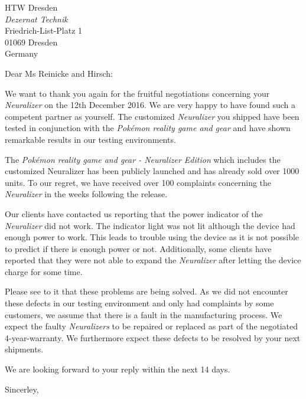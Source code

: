 \begin{letter}{
HTW Dresden\\
\emph{Dezernat Technik}\\
Friedrich-List-Platz 1\\
01069 Dresden\\
Germany
}
\opening{Dear Ms Reinicke and Hirsch:}

We want to thank you again for the fruitful negotiations concerning your \emph{Neuralizer} on the 12th December 2016. We are very happy to have found such a competent partner as yourself. The customized \emph{Neuralizer} you shipped have been tested in conjunction with the \emph{Pokémon reality game and gear} and have shown remarkable results in our testing environments.

The \emph{Pokémon reality game and gear - Neuralizer Edition} which includes the customized Neuralizer has been publicly launched and has already sold over 1000 units. To our regret, we have received over 100 complaints concerning the \emph{Neuralizer} in the weeks following the release. 

Our clients have contacted us reporting that the power indicator of the \emph{Neuralizer} did not work. The indicator light was not lit although the device had enough power to work. This leads to trouble using the device as it is not possible to predict if there is enough power or not.  Additionally, some clients have reported that they were not able to expand the \emph{Neuralizer} after letting the device charge for some time. 

Please see to it that these problems are being solved. As we did not encounter these defects in our testing environment and only had complaints by some customers, we assume that there is a fault in the manufacturing process. We expect the faulty \emph{Neuralizers} to be repaired or replaced as part of the negotiated 4-year-warranty. We furthermore expect these defects to be resolved by your next shipments.

We are looking forward to your reply within the next 14 days.

\closing{Sincerley,}
\end{letter}

